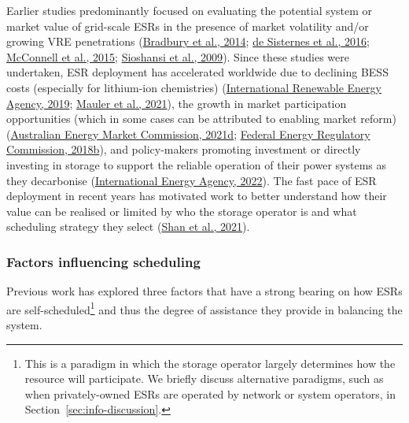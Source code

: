 \documentclass[12pt,a4paper,]{report}
\begin{document}
Earlier studies predominantly focused on evaluating the potential system
or market value of grid-scale ESRs in the presence of market volatility
and/or growing VRE penetrations
(\protect\hyperlink{ref-bradburyEconomicViabilityEnergy2014}{Bradbury et
al., 2014}; \protect\hyperlink{ref-desisternesValueEnergyStorage2016}{de
Sisternes et al., 2016};
\protect\hyperlink{ref-mcconnellEstimatingValueElectricity2015}{McConnell
et al., 2015};
\protect\hyperlink{ref-sioshansiEstimatingValueElectricity2009}{Sioshansi
et al., 2009}). Since these studies were undertaken, ESR deployment has
accelerated worldwide due to declining BESS costs (especially for
lithium-ion chemistries)
(\protect\hyperlink{ref-internationalrenewableenergyagencyUtilityscaleBatteriesInnovation2019}{International
Renewable Energy Agency, 2019};
\protect\hyperlink{ref-maulerBatteryCostForecasting2021}{Mauler et al.,
2021}), the growth in market participation opportunities (which in some
cases can be attributed to enabling market reform)
(\protect\hyperlink{ref-australianenergymarketcommissionIntegratingEnergyStorage2021}{Australian
Energy Market Commission, 2021d};
\protect\hyperlink{ref-federalenergyregulatorycommissionOrderNo8412018}{Federal
Energy Regulatory Commission, 2018b}), and policy-makers promoting
investment or directly investing in storage to support the reliable
operation of their power systems as they decarbonise
(\protect\hyperlink{ref-internationalenergyagencyGridScaleStorage2022}{International
Energy Agency, 2022}). The fast pace of ESR deployment in recent years
has motivated work to better understand how their value can be realised
or limited by who the storage operator is and what scheduling strategy
they select
(\protect\hyperlink{ref-shanDeleteriousEffectsStrategic2021}{Shan et
al., 2021}).

\hypertarget{sec:info-context-esr-operation}{%
\subsubsection{Factors influencing
scheduling}\label{sec:info-context-esr-operation}}

Previous work has explored three factors that have a strong bearing on
how ESRs are self-scheduled\footnote{This is a paradigm in which the
  storage operator largely determines how the resource will participate.
  We briefly discuss alternative paradigms, such as when privately-owned
  ESRs are operated by network or system operators, in
  Section~\ref{sec:info-discussion}.} and thus the degree of assistance
they provide in balancing the system.
\end{document}

